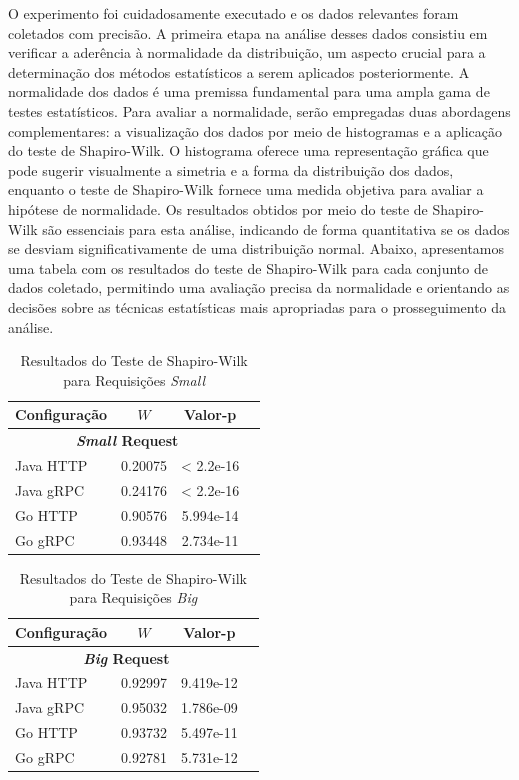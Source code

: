 O experimento foi cuidadosamente executado e os dados relevantes foram coletados com precisão.
A primeira etapa na análise desses dados consistiu em verificar a aderência à normalidade da distribuição, um aspecto crucial para a determinação dos métodos estatísticos a serem aplicados posteriormente.
A normalidade dos dados é uma premissa fundamental para uma ampla gama de testes estatísticos.
Para avaliar a normalidade, serão empregadas duas abordagens complementares: a visualização dos dados por meio de histogramas e a aplicação do teste de Shapiro-Wilk.
O histograma oferece uma representação gráfica que pode sugerir visualmente a simetria e a forma da distribuição dos dados, enquanto o teste de Shapiro-Wilk fornece uma medida objetiva para avaliar a hipótese de normalidade.
Os resultados obtidos por meio do teste de Shapiro-Wilk são essenciais para esta análise, indicando de forma quantitativa se os dados se desviam significativamente de uma distribuição normal.
Abaixo, apresentamos uma tabela com os resultados do teste de Shapiro-Wilk para cada conjunto de dados coletado, permitindo uma avaliação precisa da normalidade e orientando as decisões sobre as técnicas estatísticas mais apropriadas para o prosseguimento da análise.

\begin{table}[h]
\centerin
\begin{tabular}{lccc}
\hline
\textbf{Configuração} & \textbf{\(W\)} & \textbf{Valor-p} \\
\hline
\multicolumn{3}{c}{\textbf{\textit{Small} Request}} \\
\hline
Java HTTP & 0.20075 & < 2.2e-16 \\
Java gRPC & 0.24176 & < 2.2e-16 \\
Go HTTP & 0.90576 & 5.994e-14 \\
Go gRPC & 0.93448 & 2.734e-11 \\
\hline
\end{tabular}
\caption{Resultados do Teste de Shapiro-Wilk para Requisições \textit{Small}}
\label{tab:shapiro-results-small}
\end{table}

\begin{table}[h]
\centering
\begin{tabular}{lccc}
\hline
\textbf{Configuração} & \textbf{\(W\)} & \textbf{Valor-p} \\
\hline
\multicolumn{3}{c}{\textbf{\textit{Big} Request}} \\
\hline
Java HTTP & 0.92997 & 9.419e-12 \\
Java gRPC & 0.95032 & 1.786e-09 \\
Go HTTP & 0.93732 & 5.497e-11 \\
Go gRPC & 0.92781 & 5.731e-12 \\
\hline
\end{tabular}
\caption{Resultados do Teste de Shapiro-Wilk para Requisições \textit{Big}}
\label{tab:shapiro-results-big}
\end{table}

